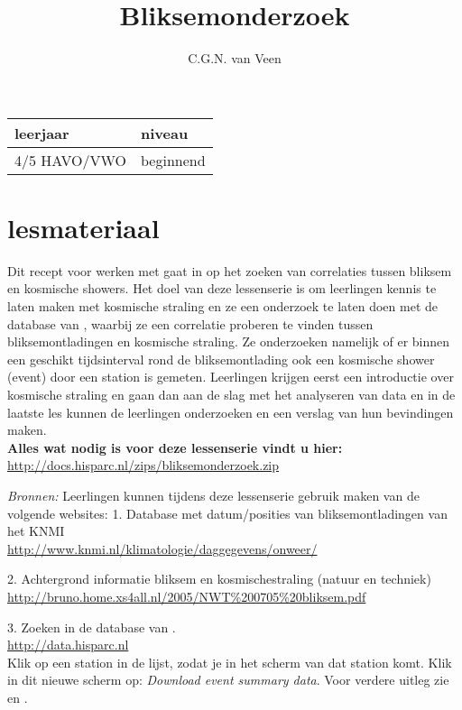 
\usepackage{xfrac}
\usepackage{array}

\title{Bliksemonderzoek}
\author{C.G.N. van Veen}



\maketitle

\begin{tabular}{|>{\raggedright}p{3cm}|>{\raggedright}p{12cm}|}
\hline 
leerjaar & niveau \tabularnewline
\hline 
4/5 HAVO/VWO  & beginnend \tabularnewline
\hline 
\end{tabular}

\section{lesmateriaal}

Dit recept voor werken met \hisparc gaat in op het zoeken van correlaties tussen 
bliksem en kosmische showers. Het doel van deze lessenserie is om leerlingen 
kennis te laten maken met kosmische straling en ze een onderzoek te laten doen 
met de database van \hisparc, waarbij ze een correlatie proberen te vinden tussen 
bliksemontladingen en kosmische straling. Ze onderzoeken namelijk of er binnen een geschikt
tijdsinterval rond de bliksemontlading ook een kosmische shower (event) door 
een \hisparc station is gemeten.
Leerlingen krijgen eerst een introductie over kosmische straling en gaan
dan aan de slag met het analyseren van \hisparc data en in de laatste les kunnen 
de leerlingen onderzoeken en een verslag van hun bevindingen maken.
\\

\textbf{Alles wat nodig is voor deze lessenserie vindt u hier:}\\
\url{http://docs.hisparc.nl/zips/bliksemonderzoek.zip}


\textit{Bronnen:} Leerlingen kunnen tijdens deze lessenserie gebruik maken van de 
volgende websites:
1. Database met datum/posities van bliksemontladingen van het KNMI\\
\url{ http://www.knmi.nl/klimatologie/daggegevens/onweer/}

2. Achtergrond informatie bliksem en kosmischestraling (natuur en techniek)\\
\url{ http://bruno.home.xs4all.nl/2005/NWT%200705%20bliksem.pdf}

3. Zoeken in de database van \hisparc.\\
\url{http://data.hisparc.nl}\\
Klik op een station in de lijst, zodat je in het scherm van dat station komt.
Klik in dit nieuwe scherm op: \textit{Download event summary data}.
Voor verdere uitleg zie  en .

